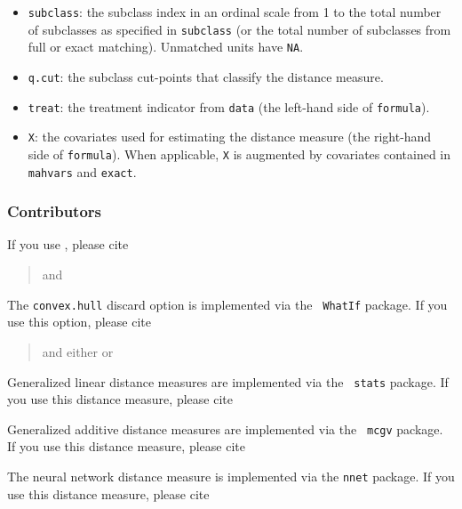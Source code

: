 \begin{itemize}
\item \texttt{subclass}: the subclass index in an ordinal scale from 1
  to the total number of subclasses as specified in \texttt{subclass}
  (or the total number of subclasses from full or exact matching).
  Unmatched units have \texttt{NA}.
  
\item \texttt{q.cut}: the subclass cut-points that classify the
  distance measure.
  
\item \texttt{treat}: the treatment indicator from \texttt{data} (the
  left-hand side of \texttt{formula}).
 
\item \texttt{X}: the covariates used for estimating the distance
  measure (the right-hand side of \texttt{formula}).  When applicable,
  \texttt{X} is augmented by covariates contained in \texttt{mahvars}
  and \texttt{exact}.
\end{itemize}

\subsubsection{Contributors}

If you use \MatchIt, please cite
\begin{verse}
and 
\end{verse}

The {\tt convex.hull} discard option is implemented via the {\tt
  WhatIf} package.  If you use this option, please cite
\begin{verse}
and either
or
\end{verse} 

Generalized linear distance measures are implemented via the {\tt
stats} package.  If you use this distance measure, please cite 
\begin{verse}
\end{verse}

Generalized additive distance measures are implemented via the {\tt
  mcgv} package.  If you use this distance measure, please cite
\begin{verse}
\end{verse}  

The neural network distance measure is implemented via the {\tt nnet}
package.  If you use this distance measure, please cite
\begin{verse}
\end{verse}

